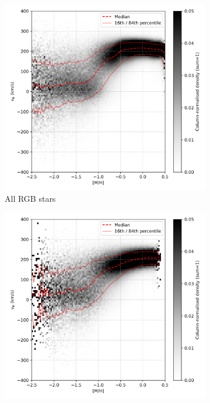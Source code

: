 \documentclass[a4paper,12pt]{article}
\begin{document}
\begin{figure}[H]
  \centering
  \begin{subfigure}[b]{0.32\textwidth}
    \includegraphics[width=\textwidth]{../figures/vis_mh_vphi_all.png}
    \caption{All RGB stars}
  \end{subfigure}\hfill
  \begin{subfigure}[b]{0.32\textwidth}
    \includegraphics[width=\textwidth]{../figures/vis_mh_vphi_high_alpha.png}

\end{subfigure}
\end{figure}
\end{document}
